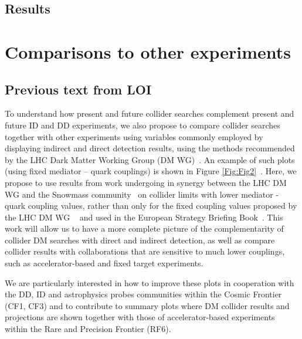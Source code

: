\documentclass[11pt]{article}
\begin{document}
\subsection{Results}

\section{Comparisons to other experiments}

\subsection{Previous text from LOI}

To understand how present and future collider searches complement present and future ID and DD experiments, we also propose to compare collider searches together with other experiments using variables commonly employed by displaying indirect and direct detection results, using the methods recommended by the LHC Dark Matter Working Group (DM WG)~\cite{BOVEIA2020100365,ALBERT2019100377}. An example of such plots (using fixed mediator – quark couplings) is shown in Figure \ref{Fig:Fig2}~\cite{Ellis:2691414}. Here, we propose to use results from work undergoing in synergy between the LHC DM WG and the Snowmass community~\cite{LOIVaryingCouplings} on collider limits with lower mediator - quark coupling values, rather than only for the fixed coupling values proposed by the LHC DM WG ~\cite{BOVEIA2020100365,ALBERT2019100377} and used in the European Strategy Briefing Book~\cite{Ellis:2691414}. This work will allow us to have a more complete picture of the complementarity of collider DM searches with direct and indirect detection, as well as compare collider results with collaborations that are sensitive to much lower couplings, such as accelerator-based and fixed target experiments. 

We are particularly interested in how to improve these plots in cooperation with the DD, ID and astrophysics probes communities within the Cosmic Frontier (CF1, CF3) and to contribute to summary plots where DM collider results and projections are shown together with those of accelerator-based experiments within the Rare and Precision Frontier (RF6). 
\end{document}
